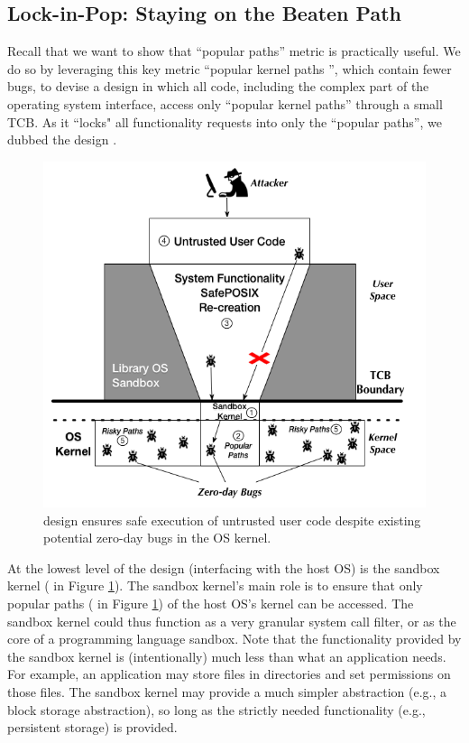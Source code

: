 \subsection{Lock-in-Pop: Staying on the Beaten Path}
\label{lock-in-pop}

Recall that we want to show that ``popular paths'' metric is practically useful. 
We do so by leveraging this key metric ``popular kernel paths '', which contain fewer bugs, to devise a design
in which all code, including the complex part
of the operating system interface, access only
``popular kernel paths'' through a small TCB. As it ``locks" all functionality
requests into only the ``popular paths'', we dubbed the design \lip.

\begin{figure}%
\centering
\includegraphics[width=1.0\columnwidth]{diagram/Virtualization_Design_Model_01.png}
\caption{\small \lip design ensures safe execution of untrusted user code
despite existing potential zero-day bugs in the OS kernel.}
\label{fig:design_safe_reimplementation}
\end{figure}

At the lowest level of the design (interfacing with the host OS) is the
sandbox kernel ( in Figure \ref{fig:design_safe_reimplementation}).
The sandbox kernel's main role is to ensure that only popular paths ( in Figure \ref{fig:design_safe_reimplementation})
of the host OS's kernel can be accessed. 
The sandbox kernel could thus function as a very granular system call filter, or
as the core of a programming language sandbox. Note that the functionality
provided by the sandbox kernel is (intentionally) much less than what
an application needs. For example, an application may store files in directories and set permissions on those files.
The sandbox kernel may provide a much simpler abstraction (e.g., a block storage abstraction),
so long as the strictly needed functionality (e.g., persistent storage) is provided.

